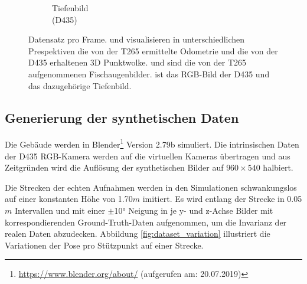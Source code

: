 \begin{figure}[H]
\begin{subfigure}[t]{0.3\linewidth}
		\caption{Tiefenbild \\ (D435) \hspace*{2cm}}
		\label{subfig:depth-image}
	\end{subfigure}
	\caption{Datensatz pro Frame.   und  visualisieren in unterschiedlichen Prespektiven die von der T265 ermittelte Odometrie und die von der D435 erhaltenen 3D Punktwolke.  und  sind die von der T265 aufgenommenen Fischaugenbilder.  ist das RGB-Bild der D435 und  das dazugehörige Tiefenbild. }
	\label{fig:dataset}
\end{figure}

\subsection{Generierung der synthetischen Daten}
\label{subsec:generate_synth_images}

Die Gebäude werden in Blender\footnote{\url{https://www.blender.org/about/} (aufgerufen am: 20.07.2019)} Version 2.79b simuliert. Die intrinsischen Daten der D435 RGB-Kamera werden auf die virtuellen Kameras übertragen und aus Zeitgründen wird die Auflösung der synthetischen Bilder auf  $960\times540$ halbiert.

Die Strecken der echten Aufnahmen werden in den Simulationen schwankungslos auf einer konstanten Höhe von 1.70$m$ imitiert. Es wird entlang der Strecke in 0.05$m$ Intervallen und mit einer $\pm$10° Neigung in je y- und z-Achse Bilder mit korrespondierenden Ground-Truth-Daten aufgenommen, um die Invarianz der realen Daten abzudecken. Abbildung \ref{fig:dataset_variation} illustriert die Variationen der Pose pro Stützpunkt auf einer Strecke.


